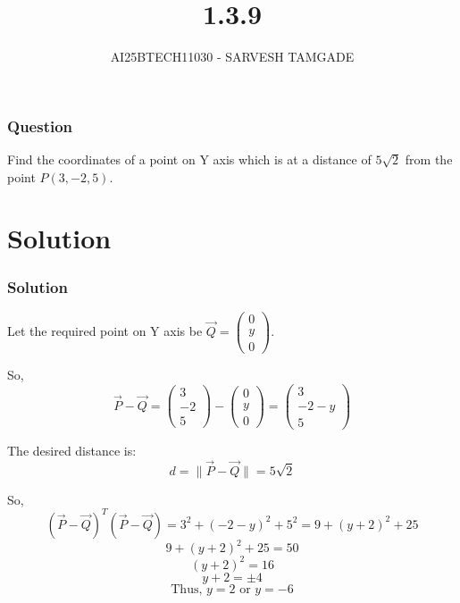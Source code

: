 \documentclass{beamer}
\title{1.3.9}
\author{AI25BTECH11030 - SARVESH TAMGADE}
\theoremstyle{remark}
\numberwithin{equation}{section}
\numberwithin{equation}{section}
\begin{document}
\begin{frame}
\titlepage
\end{frame}

\begin{frame}
\frametitle{Question}

Find the coordinates of a point on Y axis which is at a distance of \( 5\sqrt{2} \) from the point \( P(3, -2, 5) \).

\end{frame}

\section{Solution}

\begin{frame}
\frametitle{Solution}

Let the required point on Y axis be \(\vec{Q} = \begin{pmatrix}0 \\ y \\ 0\end{pmatrix}\).

So,
\[
\vec{P} - \vec{Q} = 
\begin{pmatrix} 3 \\ -2 \\ 5 \end{pmatrix} - 
\begin{pmatrix} 0 \\ y \\ 0 \end{pmatrix} = 
\begin{pmatrix} 3 \\ -2 - y \\ 5 \end{pmatrix}
\]

The desired distance is:
\[
d = \|\vec{P} - \vec{Q}\| = 5\sqrt{2}
\]

So,
\[
(\vec{P} - \vec{Q})^T (\vec{P} - \vec{Q}) = 3^2 + (-2 - y)^2 + 5^2 = 9 + (y + 2)^2 + 25
\]
\[
9 + (y+2)^2 + 25 = 50
\]
\[
(y+2)^2 = 16
\]
\[
y + 2 = \pm 4
\]
\[
\text{Thus, } y = 2 \text{ or } y = -6
\]

\end{frame}
\end{document}
